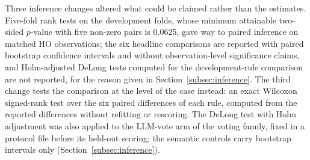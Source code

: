 \documentclass[final,5p,twocolumn]{elsarticle}
\begin{document}
Three inference changes altered what could be claimed rather than the estimates. Five-fold rank tests on the development folds, whose minimum attainable two-sided $p$-value with five non-zero pairs is 0.0625, gave way to paired inference on matched HO observations; the six headline comparisons are reported with paired bootstrap confidence intervals and without observation-level significance claims, and Holm-adjusted DeLong tests computed for the development-rule comparison are not reported, for the reason given in Section~\ref{subsec:inference}. The third change tests the comparison at the level of the case instead: an exact Wilcoxon signed-rank test over the six paired differences of each rule, computed from the reported differences without refitting or rescoring. The DeLong test with Holm adjustment was also applied to the LLM-vote arm of the voting family, fixed in a protocol file before its held-out scoring; the semantic controls carry bootstrap intervals only (Section~\ref{subsec:inference}).
\end{document}
